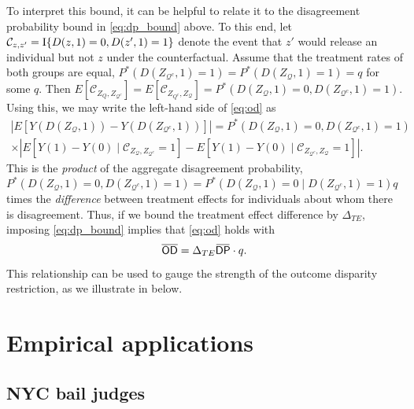 \documentclass[12pt]{article}%
\theoremstyle{definition}
\newcommand\1{\operatorname{I}\indicatorfence}
\newcommand{\overbar}[1]{\mkern 1.5mu\overline{\mkern-1.5mu#1\mkern-1.5mu}%
  \mkern 1.5mu}%
\newcommand{\OD}{\mathsf{OD}}
\newcommand{\DP}{\mathsf{DP}}
\begin{document}
To interpret this bound, it can be helpful to relate it to the disagreement
probability bound in \cref{eq:dp_bound} above. To this end, let
$\mathcal{C}_{z, z'}=\1{D(z, 1)=0, D(z', 1)=1}$ denote the event that $z'$ would
release an individual but not $z$ under the counterfactual. Assume that the
treatment rates of both groups are equal,
$P^*(D(Z_{\mathcal{Q}^c},1)=1)=P^{*}(D(Z_{\mathcal{Q}}, 1)=1)=q$ for some $q$.
Then
$E[\mathcal{C}_{{Z}_{Q}, {Z}_{\mathcal{Q}^{c}}}]=E[\mathcal{C}_{{Z}_{Q^{c}},
  {Z}_{\mathcal{Q}}}]=P^*(D(Z_{\mathcal{Q}}, 1)=0, D(Z_{\mathcal{Q}^c},1)=1)$.
Using this, we may write the left-hand side of \cref{eq:od} as
\begin{multline*}
  | E[Y(D(Z_{\mathcal{Q}}, 1))-Y(D(Z_{\mathcal{Q}^{c}},
  1))] | =P^*(D(Z_{\mathcal{Q}}, 1)=0, D(Z_{\mathcal{Q}^c},1)=1)\\
  \times | E[Y(1)-Y(0)\mid \mathcal{C}_{{Z}_\mathcal{Q}, {Z}_{\mathcal{Q}^{c}}} = 1]
  -E[Y(1)-Y(0)\mid \mathcal{C}_{{Z}_{\mathcal{Q}^{c}}, {Z}_\mathcal{Q}} = 1]| .
\end{multline*}
This is the \emph{product} of the aggregate disagreement probability,
$P^*(D(Z_{\mathcal{Q}}, 1)=0, D(Z_{\mathcal{Q}^c},1)=1)=P^*(D(Z_{\mathcal{Q}}, 1)=0\mid D(Z_{\mathcal{Q}^c},1)=1)q$ times the \emph{difference} between treatment effects for individuals about whom there is disagreement. Thus, if we bound the treatment effect difference by $\Delta_{TE}$, imposing \cref{eq:dp_bound} implies that \cref{eq:od} holds with
\begin{equation}\label{eq:od_dp_relation}
\overline{\OD}=\Delta_{TE} \overbar{\DP}\cdot q.
\end{equation}
This relationship can be used to gauge the strength of the outcome disparity
restriction, as we illustrate in  below.




\section{Empirical applications}\label{sec:empirical-apps}

\subsection{NYC bail judges}\label{sec:nyc-bail-judges}
\end{document}
